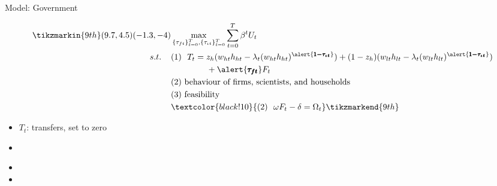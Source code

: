 \documentclass[11pt,aspectratio=169]{beamer}
\begin{document}
\addtocounter{framenumber}{-1}
\begin{frame}{Model: Government}
	\begin{minipage}[t!]{1\textwidth}
		\begin{align*}
		\tikzmarkin{9th}(9.7,4.5)(-1.3,-4)
		&\max_{\{\tau_{ft}\}_{t=0}^{T}, \{\tau_{\iota t}\}_{t=0}^{T}} \sum_{t=0}^{T}\beta^t U_{t}\\
		s.t. \hspace{4mm}
		&(1)\ \ T_t= z_h(w_{ht}h_{ht}-\lambda_t(w_{ht}h_{ht})^{\alert{\pmb{1-\tau_{\iota t}}}})+(1-z_h)(w_{lt}h_{lt}-\lambda_t(w_{lt}h_{lt})^{\alert{\pmb{1-\tau_{\iota t}}}})\\ & \hspace{15mm }+\alert{\pmb{\tau_{ft}}}F_{t}\\
		& (2)\ \text{behaviour of firms, scientists, and households}\\
		& (3)\ \text{feasibility} \\
		&\textcolor{black!10}{
			(2)\ \  \omega F_t-\delta =\Omega_t }
		\tikzmarkend{9th}
		\end{align*}
	\end{minipage}
	
	\small
	\vspace{0mm}
	\begin{minipage}[t!]{0.35\textwidth}
		\vspace{7mm}
		\begin{itemize}
			\item[] $T_t$: transfers, set to zero  \vspace{0mm}
			\item[] 
		\end{itemize}
	\end{minipage}
	\begin{minipage}[t!]{0.6\textwidth}
		\vspace{8mm}
		\begin{itemize}
			\item[]%
			\vspace{0mm}	
			\item[] %
		\end{itemize}
	\end{minipage}

\end{frame}
\end{document}
